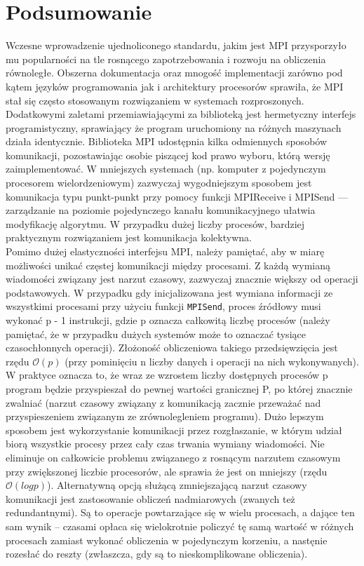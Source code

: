 \section{Podsumowanie}

Wczesne wprowadzenie ujednoliconego standardu, jakim jest MPI przysporzyło mu popularności na tle rosnącego zapotrzebowania i rozwoju na obliczenia równoległe. Obszerna dokumentacja oraz mnogość implementacji zarówno pod kątem języków programowania jak i architektury procesorów sprawiła, że MPI stał się często stosowanym rozwiązaniem w systemach rozproszonych. Dodatkowymi zaletami przemiawiającymi za biblioteką jest hermetyczny interfejs programistyczny, sprawiający że program uruchomiony na różnych maszynach działa identycznie. Biblioteka MPI udostępnia kilka odmiennych sposobów komunikacji, pozostawiając osobie piszącej kod prawo wyboru, którą wersję zaimplementować. W mniejszych systemach (np. komputer z pojedynczym procesorem wielordzeniowym) zazwyczaj wygodniejszym sposobem jest komunikacja typu punkt-punkt przy pomocy funkcji MPI\textunderscore Receive i MPI\textunderscore Send --- zarządzanie na poziomie pojedynczego kanału komunikacyjnego ułatwia modyfikację algorytmu. W przypadku dużej liczby procesów, bardziej praktycznym  rozwiązaniem jest komunikacja kolektywna. \\

Pomimo dużej elastyczności interfejsu MPI, należy pamiętać, aby w miarę możliwości unikać częstej komunikacji między procesami. Z każdą wymianą wiadomości związany jest narzut czasowy, zazwyczaj znacznie większy od operacji podstawowych. W przypadku gdy inicjalizowana jest wymiana informacji ze wszystkimi procesami przy użyciu funkcji \texttt{MPI\textunderscore Send}, proces źródłowy musi wykonać p - 1 instrukcji, gdzie p oznacza całkowitą liczbę procesów (należy pamiętać, że w przypadku dużych systemów może to oznaczać tysiące czasochłonnych operacji). Złożoność obliczeniowa takiego przedsięwzięcia jest rzędu $\mathcal{O}(p)$ (przy pominięciu n liczby danych i operacji na nich wykonywanych). W praktyce oznacza to, że wraz ze wzrostem liczby dostępnych procesów p program będzie przyspieszał do pewnej wartości granicznej P, po której znacznie zwalniać (narzut czasowy związany z komunikacją zacznie przeważać nad przyspieszeniem związanym ze zrównolegleniem programu). Dużo lepszym sposobem jest wykorzystanie komunikacji przez rozgłaszanie, w którym udział biorą wszystkie procesy przez cały czas trwania wymiany wiadomości. Nie eliminuje on całkowicie problemu związanego z rosnącym narzutem czasowym przy zwiększonej liczbie procesorów, ale sprawia że jest on mniejszy (rzędu $\mathcal{O}(logp)$). Alternatywną opcją służącą zmniejszającą narzut czasowy komunikacji jest zastosowanie obliczeń nadmiarowych (zwanych też redundantnymi). Są to operacje powtarzające się w wielu procesach, a dające ten sam wynik -- czasami opłaca się wielokrotnie policzyć tę samą wartość w różnych procesach zamiast wykonać obliczenia w pojedynczym korzeniu, a nastęnie rozesłać do reszty (zwłaszcza, gdy są to nieskomplikowane obliczenia). 